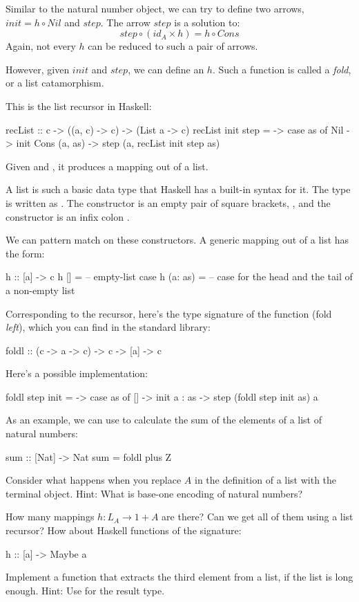 \documentclass[DaoFP]{subfiles}
\begin{document}
Similar to the natural number object, we can try to define two arrows, $init = h \circ Nil$ and $step$. The arrow $step$ is a solution to:
\[ step \circ (id_A \times h) = h \circ Cons \]
Again, not every $h$ can be reduced to such a pair of arrows.

However, given $init$ and $step$, we can define an $h$. Such a function is called a \emph{fold}, or a list catamorphism. 

This is the list recursor in Haskell:
\begin{haskell}
recList :: c -> ((a, c) -> c) -> (List a -> c)
recList init step = \as ->
  case as of 
    Nil          -> init
    Cons (a, as) -> step (a, recList init step as)
\end{haskell}
Given  and , it produces a mapping out of a list.

A list is such a basic data type that Haskell has a built-in syntax for it. The type  is written as \hask{[a]}. The  constructor is an empty pair of square brackets, \hask{[]}, and the  constructor is an infix colon \hask{:}.

We can pattern match on these constructors. A generic mapping out of a list has the form:
\begin{haskell}
h :: [a] -> c
h []      = -- empty-list case
h (a: as) = -- case for the head and the tail of a non-empty list
\end{haskell}

Corresponding to the recursor, here's the type signature of the function  (fold \emph{left}), which you can find in the standard library:
\begin{haskell}
foldl :: (c -> a -> c) -> c -> [a] -> c
\end{haskell}
Here's a possible implementation:
\begin{haskell}
foldl step init = \as ->
  case as of
    [] -> init
    a : as -> step (foldl step init as) a
\end{haskell}

As an example, we can use  to calculate the sum of the elements of a list of natural numbers:
\begin{haskell}
sum :: [Nat] -> Nat
sum = foldl plus Z
\end{haskell}


\begin{exercise}
Consider what happens when you replace $A$ in the definition of a list with the terminal object. Hint: What is base-one encoding of natural numbers?
\end{exercise}
\begin{exercise}
How many mappings $h \colon L_A \to 1 + A$ are there? Can we get all of them using a list recursor? How about Haskell functions of the signature:
\begin{haskell}
h :: [a] -> Maybe a
\end{haskell}
\end{exercise}
\begin{exercise}
Implement a function that extracts the third element from a list, if the list is long enough. Hint: Use  for the result type.
\end{exercise}
\end{document}
